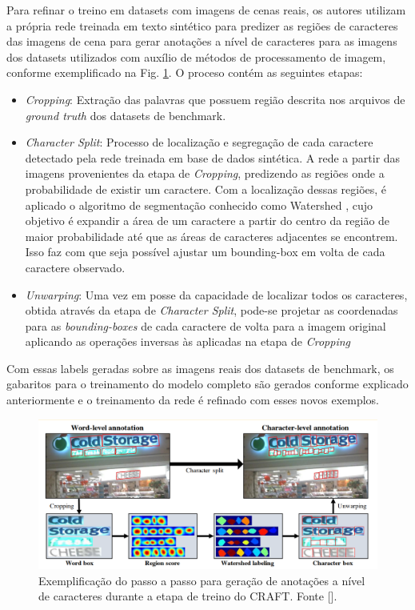 Para refinar o treino em datasets com imagens de cenas reais, os autores utilizam a própria rede treinada em texto sintético para predizer as regiões de caracteres das imagens de cena para gerar anotações a nível de caracteres para as imagens dos datasets utilizados com auxílio de métodos de processamento de imagem, conforme exemplificado na Fig. \ref{fig:craft_char_level_annotation}. O proceso contém as seguintes etapas:

\begin{itemize}
    \item \textit{Cropping}: Extração das palavras que possuem região descrita nos arquivos de \textit{ground truth} dos datasets de benchmark.
    \item \textit{Character Split}: Processo de localização e segregação de cada caractere detectado pela rede treinada em base de dados sintética. A rede a partir das imagens provenientes da etapa de \textit{Cropping}, predizendo as regiões onde a probabilidade de existir um caractere. Com a localização dessas regiões, é aplicado o algoritmo de segmentação conhecido como Watershed \cite{WatershedOverview}, cujo objetivo é expandir a área de um caractere a partir do centro da região de maior probabilidade até que as áreas de caracteres adjacentes se encontrem. Isso faz com que seja possível ajustar um bounding-box em volta de cada caractere observado.
    \item \textit{Unwarping}: Uma vez em posse da capacidade de localizar todos os caracteres, obtida através da etapa de \textit{Character Split}, pode-se projetar as coordenadas para as \textit{bounding-boxes} de cada caractere de volta para a imagem original aplicando as operações inversas às aplicadas na etapa de \textit{Cropping}
\end{itemize}

Com essas labels geradas sobre as imagens reais dos datasets de benchmark, os gabaritos para o treinamento do modelo completo são gerados conforme explicado anteriormente e o treinamento da rede é refinado com esses novos exemplos.

\begin{figure}
    \centering
    \includegraphics[width=\textwidth]{figs/craft-char-level-annotation.png}
    \caption{Exemplificação do passo a passo para geração de anotações a nível de caracteres durante a etapa de treino do CRAFT. Fonte [].}
    \label{fig:craft_char_level_annotation}
\end{figure}

